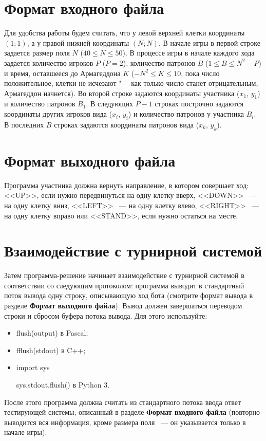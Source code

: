 \documentclass[a4paper,12pt]{article}
\begin{document}
\section{Формат входного файла}
Для удобства работы будем считать, что у левой верхней клетки координаты $(1;1)$, а у правой нижней координаты $(N;N)$. В начале игры в первой строке задается размер поля $N$ ($40 \leq N \leq 50$).
В процессе игры в начале каждого хода задается количество игроков $P$ ($P = 2$), количество патронов $B$ ($1 \leq B \leq N^2 - P$) и время, оставшееся до Армагеддона $K$ ($-N^2 \leq K \leq 10$, пока число положительное, клетки не исчезают "--- как только число станет отрицательным, Армагеддон начнется).
Во второй строке задаются координаты участника ($x_1$, $y_1$) и количество патронов $B_1$.
В следующих $P-1$ строках построчно задаются координаты других игроков вида ($x_i$, $y_i$) и количество патронов у участника $B_i$.
В последних $B$ строках задаются координаты патронов вида ($x_k$, $y_k$).

\section{Формат выходного файла}
Программа участника должна вернуть направление, в котором совершает ход: <<UP>>, если нужно передвинуться на одну клетку вверх, <<DOWN>> ~--- на одну клетку вниз, <<LEFT>> ~--- на одну клетку влево, <<RIGHT>> ~--- на одну клетку вправо или <<STAND>>, если нужно остаться на месте.

\section{Взаимодействие с турнирной системой}
Затем программа-решение начинает взаимодействие с турнирной системой в соответствии со следующим протоколом:
программа выводит в стандартный поток вывода одну строку, описывающую ход бота (смотрите формат вывода в разделе \textbf{Формат выходного файла}). Вывод должен завершаться переводом строки и сбросом буфера потока
вывода. Для этого используйте:
\begin{itemize}
\item flush(output) в Pascal;
\item fflush(stdout) в C++;
\item import sys
      
      sys.stdout.flush() в Python 3.
\end{itemize}
После этого программа должна считать из стандартного потока ввода ответ тестирующей системы, описанный в разделе \textbf{Формат входного файла} (повторно выводится вся информация, кроме размера поля ~--- он указывается только в начале игры).
\end{document}
